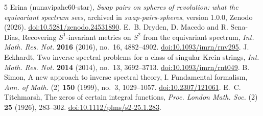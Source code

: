 \documentclass[11pt,letterpaper]{article}
\begin{document}
\begingroup\small
\begin{thebibliography}{5}
 Erina (nunavipahe60-star), \textit{Swap pairs on
spheres of revolution: what the equivariant spectrum sees}, archived
in \textit{swap-pairs-spheres}, version 1.0.0, Zenodo (2026).
\href{https://doi.org/10.5281/zenodo.24531890}{doi:10.5281/zenodo.24531890}.
 E.~B. Dryden, D. Macedo and R. Sena-Dias, Recovering
\(S^1\)-invariant metrics on \(S^2\) from the equivariant spectrum,
\textit{Int. Math. Res. Not.} \textbf{2016} (2016), no.~16, 4882--4902.
\href{https://doi.org/10.1093/imrn/rnv295}{doi:10.1093/imrn/rnv295}.
 J. Eckhardt, Two inverse spectral problems for a class
of singular Krein strings, \textit{Int. Math. Res. Not.} \textbf{2014}
(2014), no.~13, 3692--3713.
\href{https://doi.org/10.1093/imrn/rnt049}{doi:10.1093/imrn/rnt049}.
 B. Simon, A new approach to inverse spectral theory, I.
Fundamental formalism, \textit{Ann. of Math.} (2) \textbf{150} (1999),
no.~3, 1029--1057.
\href{https://doi.org/10.2307/121061}{doi:10.2307/121061}.
 E.~C. Titchmarsh, The zeros of certain integral
functions, \textit{Proc. London Math. Soc.} (2) \textbf{25} (1926),
283--302.
\href{https://doi.org/10.1112/plms/s2-25.1.283}{doi:10.1112/plms/s2-25.1.283}.
\end{thebibliography}
\endgroup
\end{document}
